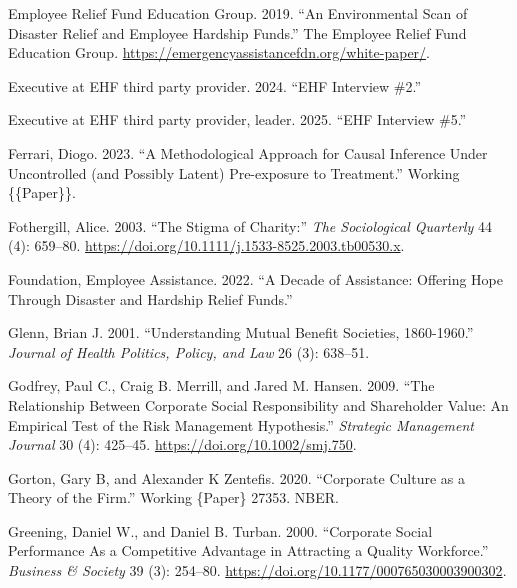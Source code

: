 \documentclass[
  11pt,
  oneside]{article}
\newlength{\cslhangindent}
\newenvironment{CSLReferences}[2] %
 {\begin{list}{}{%
  \setlength{\itemindent}{0pt}
  \setlength{\leftmargin}{0pt}
  \setlength{\parsep}{0pt}
  \ifodd #1
   \setlength{\leftmargin}{\cslhangindent}
   \setlength{\itemindent}{-1\cslhangindent}
  \fi
  \setlength{\itemsep}{#2\baselineskip}}}
 {\end{list}}
\begin{document}
\begin{CSLReferences}{1}{0}
Employee Relief Fund Education Group. 2019. {``An {Environmental} {Scan} of {Disaster} {Relief} and {Employee} {Hardship} {Funds}.''} The Employee Relief Fund Education Group. \url{https://emergencyassistancefdn.org/white-paper/}.

Executive at EHF third party provider. 2024. {``{EHF} Interview \#2.''}

Executive at EHF third party provider, leader. 2025. {``{EHF} Interview \#5.''}

Ferrari, Diogo. 2023. {``A {Methodological Approach} for {Causal Inference} Under {Uncontrolled} (and {Possibly Latent}) {Pre-exposure} to {Treatment}.''} Working \{\{Paper\}\}.

Fothergill, Alice. 2003. {``The {Stigma} of {Charity}:''} \emph{The Sociological Quarterly} 44 (4): 659--80. \url{https://doi.org/10.1111/j.1533-8525.2003.tb00530.x}.

Foundation, Employee Assistance. 2022. {``A {Decade} of {Assistance}: Offering Hope Through Disaster and Hardship Relief Funds.''}

Glenn, Brian J. 2001. {``Understanding {Mutual} {Benefit} {Societies}, 1860-1960.''} \emph{Journal of Health Politics, Policy, and Law} 26 (3): 638--51.

Godfrey, Paul C., Craig B. Merrill, and Jared M. Hansen. 2009. {``The Relationship Between Corporate Social Responsibility and Shareholder Value: An Empirical Test of the Risk Management Hypothesis.''} \emph{Strategic Management Journal} 30 (4): 425--45. \url{https://doi.org/10.1002/smj.750}.

Gorton, Gary B, and Alexander K Zentefis. 2020. {``Corporate {Culture} as a {Theory} of the {Firm}.''} Working \{Paper\} 27353. NBER.

Greening, Daniel W., and Daniel B. Turban. 2000. {``Corporate {Social Performance As} a {Competitive Advantage} in {Attracting} a {Quality Workforce}.''} \emph{Business \& Society} 39 (3): 254--80. \url{https://doi.org/10.1177/000765030003900302}.


\end{CSLReferences}
\end{document}
